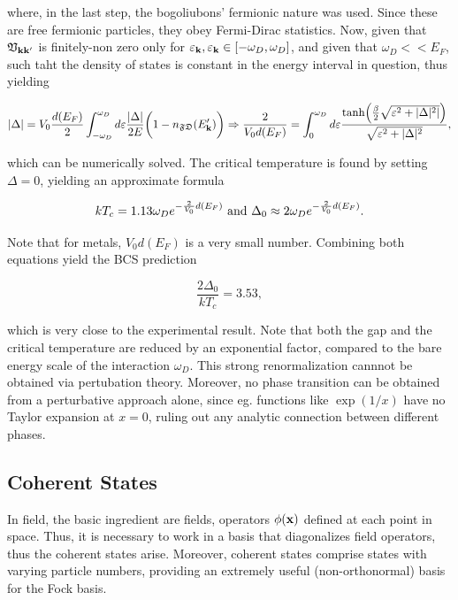 \documentclass{homework}
\begin{document}
where, in the last step, the bogoliubons' fermionic nature was used. Since these are free fermionic particles, they obey Fermi-Dirac statistics. Now, given that $\mathfrak{V}_{{\bf k}{\bf k}'}$ is finitely-non zero only for $\varepsilon_{{\bf k}}, \varepsilon_{{\bf k}} \in [-\omega_D, \omega_D]$, and given that $\omega_D << E_F$, such taht the density of states is constant in the energy interval in question, thus yielding

\begin{equation}
    |\Delta| = V_0 \frac{d(E_F)}{2} \int_{-\omega_D}^{\omega_D} d \varepsilon \frac{|\Delta|}{2E} \bigg(1 - n_{\mathfrak{F}\mathfrak{D}}(E_{\bf k}') \bigg) \Rightarrow \frac{2}{V_0 d(E_F)} = \int_{0}^{\omega_D} d\varepsilon \frac{\tanh(\frac{\beta}{2} \sqrt{\varepsilon^2+|\Delta|^2|})}{\sqrt{\varepsilon^2 + |\Delta|^2}},
\end{equation}

which can be numerically solved. The critical temperature is found by setting $\Delta = 0$, yielding an approximate formula

$$
    k T_c = 1.13 \omega_D e^{-\frac{2}{V_0} d(E_F)} \textnormal{ and } \Delta_0 \approx 2 \omega_D e^{-\frac{2}{V_0} d(E_F)}.
$$

Note that for metals, $V_0 d(E_F)$ is a very small number. Combining both equations yield the BCS prediction 

$$
\frac{2\Delta_0}{kT_c} = 3.53,
$$

which is very close to the experimental result. Note that both the gap and the critical temperature are reduced by an exponential factor, compared to the bare energy scale of the interaction $\omega_D$. This strong renormalization cannnot be obtained via pertubation theory. Moreover, no phase transition can be obtained from a perturbative approach alone, since eg. functions like $\exp(1/x)$ have no Taylor expansion at $x=0$, ruling out any analytic connection between different phases. 

\subsection{Coherent States}

In field, the basic ingredient are fields, operators $\phi({\bf x})$ defined at each point in space. Thus, it is necessary to work in a basis that diagonalizes field operators, thus the coherent states arise. Moreover, coherent states comprise states with varying particle numbers, providing an extremely useful (non-orthonormal) basis for the Fock basis.
\end{document}
